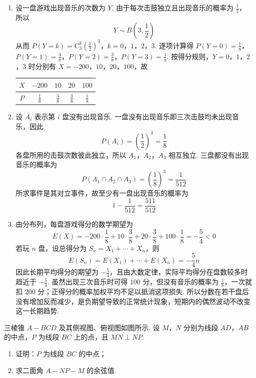 \begin{solution}
\begin{enumerate}
\item 设一盘游戏出现音乐的次数为 \(Y\). 由于每次击鼓独立且出现音乐的概率为 \(\frac12\)，所以
\[
Y\sim B\left(3,\frac12\right)
\]
从而
\(P(Y=k)=\mathrm C_3^k\left(\frac12\right)^3\)，\(k=0\)，\(1\)，\(2\)，\(3\).
逐项计算得
\(P(Y=0)=\frac18\)，\(P(Y=1)=\frac38\)，\(P(Y=2)=\frac38\)，\(P(Y=3)=\frac18\).
按得分规则，\(Y=0\)，\(1\)，\(2\)，\(3\) 时分别有 \(X=-200\)，\(10\)，\(20\)，\(100\)，故
\begin{center}
\begin{tabular}{c|cccc}
 \(X\)&\(-200\)&\(10\)&\(20\)&\(100\)\\ \hline
 \(P\)&\(\frac18\)&\(\frac38\)&\(\frac38\)&\(\frac18\)
\end{tabular}
\end{center}

\item 设 \(A_i\) 表示第 \(i\) 盘没有出现音乐. 一盘没有出现音乐即三次击鼓均未出现音乐，因此
\[
P(A_i)=\left(\frac12\right)^3=\frac18
\]
各盘所用的击鼓次数彼此独立，所以 \(A_1\)，\(A_2\)，\(A_3\) 相互独立. 三盘都没有出现音乐的概率为
\[
P(A_1\cap A_2\cap A_3)=\left(\frac18\right)^3=\frac1{512}
\]
所求事件是其对立事件，故至少有一盘出现音乐的概率为
\[
1-\frac1{512}=\frac{511}{512}
\]

\item 由分布列，每盘游戏得分的数学期望为
\[
E(X)=-200\cdot\frac18+10\cdot\frac38+20\cdot\frac38+100\cdot\frac18=-\frac54<0
\]
若玩 \(n\) 盘，设总得分为 \(S_n=X_1+\cdots+X_n\)，则
\[
E(S_n)=E(X_1)+\cdots+E(X_n)=-\frac54n
\]
因此长期平均得分的期望为 \(-\frac54\)，且由大数定律，实际平均得分在盘数较多时趋近于 \(-\frac54\). 虽然出现三次音乐时可得 \(100\) 分，但没有音乐的概率为 \(\frac18\)，一次就扣 \(200\) 分；正得分的概率加权平均不足以抵消这项损失. 所以分数在若干盘后没有增加反而减少，是负期望导致的正常统计现象，短期内的偶然波动不改变这一长期趋势.
\end{enumerate}
\end{solution}

\begin{problem}
三棱锥 \(A - BCD\) 及其侧视图、俯视图如图所示. 设 \(M\)，\(N\) 分别为线段 \(AD\)，\(AB\) 的中点，\(P\) 为线段 \(BC\) 上的点，且 \(MN \perp NP\).
\begin{enumerate}
\item 证明：\(P\) 为线段 \(BC\) 的中点；
\item 求二面角 \(A - NP - M\) 的余弦值.
\end{enumerate}

\end{problem}

